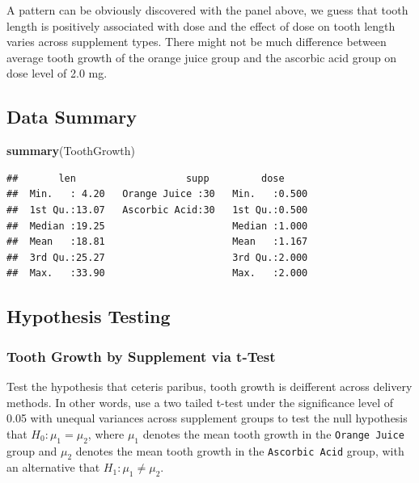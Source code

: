 \documentclass[]{article}
\newenvironment{Shaded}{\begin{snugshade}}{\end{snugshade}}
\newcommand{\KeywordTok}[1]{\textcolor[rgb]{0.13,0.29,0.53}{\textbf{#1}}}
\newcommand{\NormalTok}[1]{#1}
\begin{document}
A pattern can be obviously discovered with the panel above, we guess
that tooth length is positively associated with dose and the effect of
dose on tooth length varies across supplement types. There might not be
much difference between average tooth growth of the orange juice group
and the ascorbic acid group on dose level of 2.0 mg.

\newpage

\subsection{Data Summary}\label{data-summary}

\begin{Shaded}
\begin{Highlighting}[]
\KeywordTok{summary}\NormalTok{(ToothGrowth)}
\end{Highlighting}
\end{Shaded}

\begin{verbatim}
##       len                   supp         dose      
##  Min.   : 4.20   Orange Juice :30   Min.   :0.500  
##  1st Qu.:13.07   Ascorbic Acid:30   1st Qu.:0.500  
##  Median :19.25                      Median :1.000  
##  Mean   :18.81                      Mean   :1.167  
##  3rd Qu.:25.27                      3rd Qu.:2.000  
##  Max.   :33.90                      Max.   :2.000
\end{verbatim}

\subsection{Hypothesis Testing}\label{hypothesis-testing}

\subsubsection{Tooth Growth by Supplement via
t-Test}\label{tooth-growth-by-supplement-via-t-test}

Test the hypothesis that ceteris paribus, tooth growth is deifferent
across delivery methods. In other words, use a two tailed t-test under
the significance level of 0.05 with unequal variances across supplement
groups to test the null hypothesis that \(H_0: \mu_1=\mu_2\), where
\(\mu_1\) denotes the mean tooth growth in the \texttt{Orange\ Juice}
group and \(\mu_2\) denotes the mean tooth growth in the
\texttt{Ascorbic\ Acid} group, with an alternative that
\(H_1: \mu_1\ne\mu_2\).
\end{document}
